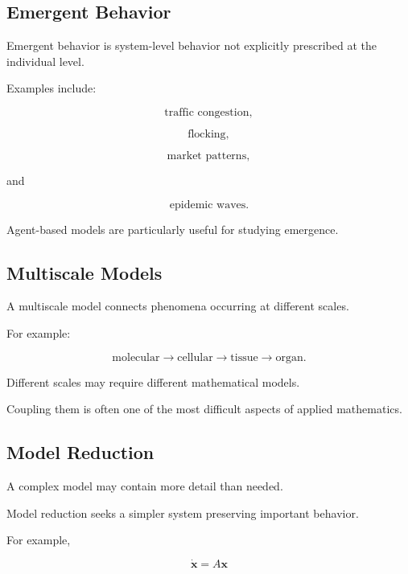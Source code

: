 \subsection{Emergent Behavior}
\label{subsec:emergent-behavior}

Emergent behavior is system-level behavior not explicitly prescribed at the
individual level.

Examples include:

\[
\boxed{
\text{traffic congestion},
}
\]

\[
\boxed{
\text{flocking},
}
\]

\[
\boxed{
\text{market patterns},
}
\]

and

\[
\boxed{
\text{epidemic waves}.
}
\]

Agent-based models are particularly useful for studying emergence.

\subsection{Multiscale Models}
\label{subsec:multiscale-models}

A multiscale model connects phenomena occurring at different scales.

For example:

\[
\boxed{
\text{molecular}
\rightarrow
\text{cellular}
\rightarrow
\text{tissue}
\rightarrow
\text{organ}.
}
\]

Different scales may require different mathematical models.

Coupling them is often one of the most difficult aspects of applied
mathematics.

\subsection{Model Reduction}
\label{subsec:model-reduction}

A complex model may contain more detail than needed.

Model reduction seeks a simpler system preserving important behavior.

For example,

\[
\boxed{
\dot{\mathbf{x}}
=
A\mathbf{x}
}
\]

